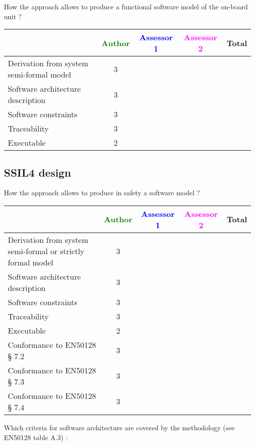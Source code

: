 How the approach allows to  produce a functional software model of the on-board unit ?

\begin{tabular}{|l | c | c | c | c|}
\hline
& \textcolor{green}{Author} & \textcolor{blue}{Assessor 1} & \textcolor{magenta}{Assessor 2} & Total \\
\hline
Derivation from system semi-formal model  &3 & & &  \\
\hline 
Software architecture description  &3 & & &  \\
\hline
Software constraints  &3 & & &  \\
\hline
Traceability  &3 & & &  \\
\hline
Executable  &2 & & &  \\
\hline
\end{tabular}

\subsection{SSIL4 design}

How the approach allows to  produce in safety a software model ?

\begin{tabular}{|l | c | c | c | c|}
\hline
& \textcolor{green}{Author} & \textcolor{blue}{Assessor 1} & \textcolor{magenta}{Assessor 2} & Total \\
\hline
Derivation from system semi-formal or strictly formal model  &3 & & &  \\
\hline 
Software architecture description  &3 & & &  \\
\hline
Software constraints  &3 & & &  \\
\hline
Traceability  &3 & & &  \\
\hline
Executable  &2 & & &  \\
\hline
Conformance to EN50128 § 7.2  &3 & & &  \\
\hline
Conformance to EN50128 § 7.3  &3 & & &  \\
\hline
Conformance to EN50128 § 7.4  & 3& & &  \\
\hline
\end{tabular}

Which criteria for software architecture are covered by the methodology
(see EN50128 table A.3) :

